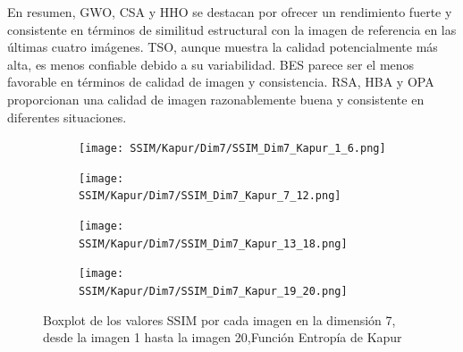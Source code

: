 \documentclass[conference]{IEEEtran}
\begin{document}
\noindent En resumen, GWO, CSA y HHO se destacan por ofrecer un rendimiento fuerte y consistente en términos de similitud estructural con la imagen de referencia en las últimas cuatro imágenes. TSO, aunque muestra la calidad potencialmente más alta, es menos confiable debido a su variabilidad. BES parece ser el menos favorable en términos de calidad de imagen y consistencia. RSA, HBA y OPA proporcionan una calidad de imagen razonablemente buena y consistente en diferentes situaciones.
\begin{figure}
	\centering
	
	\begin{subfigure}{0.4\textwidth}
		\texttt{[image: SSIM/Kapur/Dim7/SSIM\_Dim7\_Kapur\_1\_6.png]}
	\end{subfigure}
	
	\begin{subfigure}{0.4\textwidth}
		\texttt{[image: SSIM/Kapur/Dim7/SSIM\_Dim7\_Kapur\_7\_12.png]}
	\end{subfigure}
	\begin{subfigure}{0.4\textwidth}
		\texttt{[image: SSIM/Kapur/Dim7/SSIM\_Dim7\_Kapur\_13\_18.png]}
	\end{subfigure}   
	\begin{subfigure}{0.4\textwidth}
		\texttt{[image: SSIM/Kapur/Dim7/SSIM\_Dim7\_Kapur\_19\_20.png]}
		\vspace{-120pt} %
	\end{subfigure}
	\caption{Boxplot de los valores SSIM por cada imagen en la dimensión 7, desde la imagen 1 hasta la imagen 20,Función Entropía de Kapur}
	\label{fig:imagenes}    
\end{figure}
\end{document}

